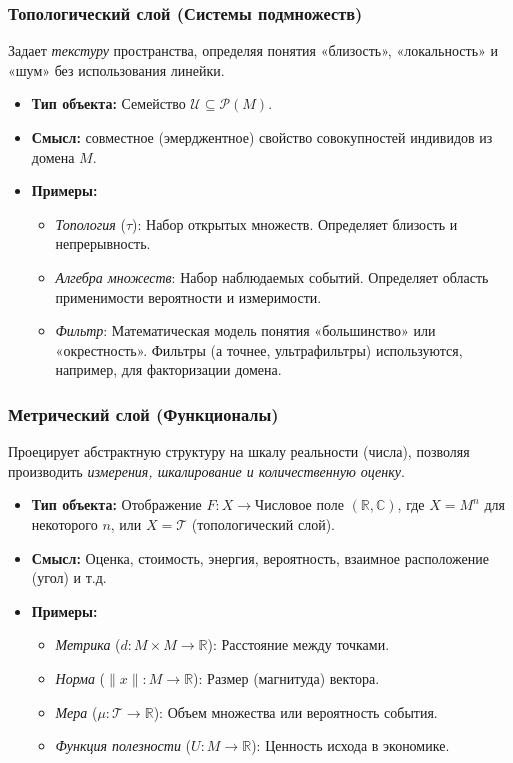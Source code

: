 \documentclass[11pt, a4paper]{extarticle}
\newcommand{\Pcal}{{\mathcal P}}
\newcommand{\Tcal}{{\mathcal T}}
\newcommand{\R}{{\mathbb R}}
\newcommand{\C}{{\mathbb C}}
\begin{document}
\subsubsection{Топологический слой (Системы подмножеств)}
Задает \textit{текстуру} пространства, определяя понятия «близость», «локальность» и «шум» без использования линейки.
\begin{itemize}
    \item \textbf{Тип объекта:} Семейство $\mathcal{U} \subseteq \Pcal(M)$.
    \item \textbf{Смысл:} совместное (эмерджентное) свойство совокупностей индивидов из домена $M$.
    \item \textbf{Примеры:}
    \begin{itemize}
        \item \textit{Топология} ($\tau$): Набор открытых множеств. Определяет близость и непрерывность.
        \item \textit{Алгебра множеств}: Набор наблюдаемых событий. Определяет область применимости вероятности и измеримости.
        \item \textit{Фильтр}: Математическая модель понятия «большинство» или «окрестность». Фильтры (а точнее, ультрафильтры) используются, например, для факторизации домена.
    \end{itemize}
\end{itemize}

\subsubsection{Метрический слой (Функционалы)}
Проецирует абстрактную структуру на шкалу реальности (числа), позволяя производить  \textit{измерения, шкалирование и количественную оценку}.
\begin{itemize}
    \item \textbf{Тип объекта:} Отображение $F: X \to \text{Числовое поле } (\R, \C)$, где $X=M^n$ для некоторого $n$, или $X=\Tcal$ (топологический слой).
    \item \textbf{Смысл:} Оценка, стоимость, энергия, вероятность, взаимное расположение (угол) и т.д.
    \item \textbf{Примеры:} 
    \begin{itemize}
        \item \textit{Метрика} ($d: M \times M \to \R$): Расстояние между точками.
        \item \textit{Норма} ($\|x\|: M \to \R$): Размер (магнитуда) вектора.
        \item \textit{Мера} ($\mu: \Tcal \to \R$): Объем множества или вероятность события.
        \item \textit{Функция полезности} ($U: M \to \R$): Ценность исхода в экономике.
    \end{itemize}
\end{itemize}
\end{document}
